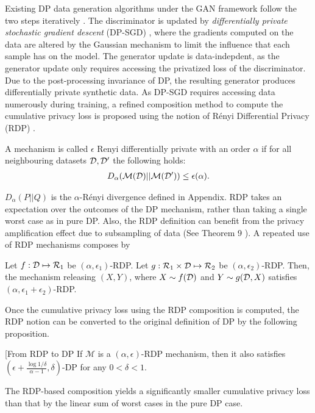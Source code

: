 \documentclass{article}
\begin{document}
Existing DP data generation algorithms under the GAN framework follow the two steps iteratively \cite{10.14778/3231751.3231757, DP_CGAN, DPGAN, 
DBLP:conf/sec/FrigerioOGD19}. The discriminator is updated by \textit{differentially private stochastic gradient descent} (DP-SGD) \cite{DP_SGD}, where the gradients computed on the data are altered by the Gaussian mechanism to limit the influence that each sample has on the model.
%
The generator update is data-indepdent, as the generator update only requires accessing the privatized loss of the discriminator. 
%
Due to the post-processing invariance of DP, the resulting generator produces differentially private synthetic data.
%
As DP-SGD requires accessing data numerously during training, 
a refined composition method to compute 
the cumulative privacy loss is proposed 
using the notion of R\'{e}nyi Differential Privacy (RDP) \citep{46029, pmlr-v89-wang19b}. 
%
%
\begin{defn}\label{defn:RDP} A mechanism is called $\epsilon$ Renyi differentially private with an order $\alpha$ if for all neighbouring datasets $\mathcal{D}, \mathcal{D}'$ the following holds:
	\begin{align}
	D_\alpha(\mathcal{M}(\mathcal{D})||\mathcal{M}(\mathcal{D}')) \leq \epsilon(\alpha).
	\end{align}
\end{defn} $D_\alpha(P||Q)$ is the $\alpha$-R\'{e}nyi divergence defined in Appendix.
%
RDP takes an expectation over the outcomes of the DP mechanism, rather than taking a single worst case as in pure DP. Also, the RDP definition can benefit from the privacy amplification effect due to subsampling of data (See Theorem 9 \cite{pmlr-v89-wang19b}).
%
%
A repeated use of RDP mechanisms composes by 
\begin{thm}\label{thm:RDP_composition}
	Let $f: \mathcal{D} \mapsto \mathcal{R}_1$ be $(\alpha, \epsilon_1)$-RDP. Let $g: \mathcal{R}_1 \times \mathcal{D} \mapsto  \mathcal{R}_2 $ be $(\alpha, \epsilon_2)$-RDP. Then, the mechanism releasing $(X, Y)$, where $X \sim f(\mathcal{D})$ and $Y \sim g(\mathcal{D}, X)$ satisfies $(\alpha, \epsilon_1 + \epsilon_2)$-RDP.
\end{thm} 
%
Once the cumulative privacy loss using the RDP composition is computed, the RDP notion can be converted to the original definition of DP by the following proposition. 
\begin{prop}\label{prop:RDPtoDP}[From RDP to DP \citep{46029}
	If $\mathcal{M}$ is a $(\alpha, \epsilon)$-RDP mechanism, then 
	it also satisfies $\left(\epsilon + \frac{\log 1/\delta}{\alpha-1}, \delta \right)$-DP for any $0<\delta<1$. 
\end{prop}
The RDP-based composition yields a significantly smaller cumulative privacy loss than that by the linear sum of worst cases in the pure DP case.  
\end{document}
